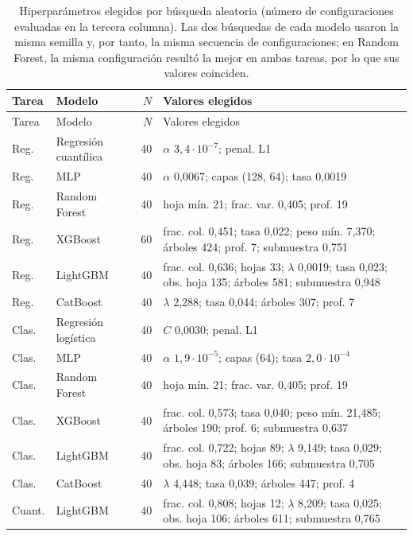 \footnotesize
\begin{longtable}{llrp{7.4cm}}
\caption{Hiperparámetros elegidos por búsqueda aleatoria (número de configuraciones evaluadas en la tercera columna). Las dos búsquedas de cada modelo usaron la misma semilla y, por tanto, la misma secuencia de configuraciones; en Random Forest, la misma configuración resultó la mejor en ambas tareas, por lo que sus valores coinciden.}\label{tab:hiper}\\
\toprule Tarea & Modelo & $N$ & Valores elegidos\\ \midrule\endfirsthead
\toprule Tarea & Modelo & $N$ & Valores elegidos\\ \midrule\endhead
\bottomrule\endfoot
Reg. & Regresión cuantílica & 40 & $\alpha$ $3{,}4\cdot10^{-7}$; penal. L1 \\
Reg. & MLP & 40 & $\alpha$ 0{,}0067; capas (128, 64); tasa 0{,}0019 \\
Reg. & Random Forest & 40 & hoja mín. 21; frac. var. 0{,}405; prof. 19 \\
Reg. & XGBoost & 60 & frac. col. 0{,}451; tasa 0{,}022; peso mín. 7{,}370; árboles 424; prof. 7; submuestra 0{,}751 \\
Reg. & LightGBM & 40 & frac. col. 0{,}636; hojas 33; $\lambda$ 0{,}0019; tasa 0{,}023; obs. hoja 135; árboles 581; submuestra 0{,}948 \\
Reg. & CatBoost & 40 & $\lambda$ 2{,}288; tasa 0{,}044; árboles 307; prof. 7 \\
\midrule
Clas. & Regresión logística & 40 & $C$ 0{,}0030; penal. L1 \\
Clas. & MLP & 40 & $\alpha$ $1{,}9\cdot10^{-5}$; capas (64); tasa $2{,}0\cdot10^{-4}$ \\
Clas. & Random Forest & 40 & hoja mín. 21; frac. var. 0{,}405; prof. 19 \\
Clas. & XGBoost & 40 & frac. col. 0{,}573; tasa 0{,}040; peso mín. 21{,}485; árboles 190; prof. 6; submuestra 0{,}637 \\
Clas. & LightGBM & 40 & frac. col. 0{,}722; hojas 89; $\lambda$ 9{,}149; tasa 0{,}029; obs. hoja 83; árboles 166; submuestra 0{,}705 \\
Clas. & CatBoost & 40 & $\lambda$ 4{,}448; tasa 0{,}039; árboles 447; prof. 4 \\
Cuant. & LightGBM & 40 & frac. col. 0{,}808; hojas 12; $\lambda$ 8{,}209; tasa 0{,}025; obs. hoja 106; árboles 611; submuestra 0{,}765 \\
\end{longtable}
\normalsize
